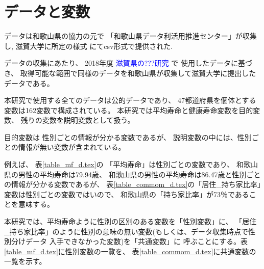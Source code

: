 \documentclass[a4j,11pt,mc, twocolumn]{jreport}
\newcommand{\tb}[1]{\textcolor{blue}{#1}} %
\begin{document}
\chapter{データと変数}\label{chapter:data}

データは和歌山県の協力の元で
「和歌山県データ利活用推進センター」が収集し,
滋賀大学に所定の様式
にてcsv形式で提供された.


データの収集にあたり、
2018年度
\tb{滋賀県の???研究}
で
使用したデータに基づき、
取得可能な範囲で同様のデータを和歌山県が収集して滋賀大学に提出したデータである。

本研究で使用する全てのデータは公的データであり、
47都道府県を個体とする
変数は162変数で構成されている。
本研究では平均寿命と健康寿命変数を目的変数、
残りの変数を説明変数として扱う。


目的変数は
性別ごとの情報が分かる変数であるが、
説明変数の中には、性別ごとの情報が無い変数が含まれている。

例えば、
表\ref{table_mf_d.tex}の
「平均寿命」は性別ごとの変数であり、
和歌山県の男性の平均寿命は79.94歳、
和歌山県の男性の平均寿命は86.47歳と性別ごとの情報が分かる変数であるが、
表\ref{table_commom_d.tex}の「居住\_持ち家比率」変数は性別ごとの変数ではいので、
和歌山県の「持ち家比率」が73％であることを意味する。

本研究では、平均寿命ように性別の区別のある変数を「性別変数」に、
「居住\_持ち家比率」のように性別の意味の無い変数(もしくは、データ収集時点で性別分けデータ
入手できなかった変数)を「共通変数」に
呼ぶことにする。表\ref{table_mf_d.tex}に性別変数の一覧を、
表\ref{table_commom_d.tex}に共通変数の一覧を示す。





%
%
%
%
%

%
%



%
\end{document}
